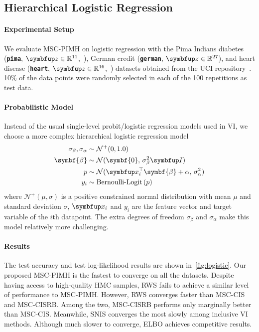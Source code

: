 \subsection{Hierarchical Logistic Regression}\label{section:logistic}
\vspace{-0.05in}
\paragraph{Experimental Setup}
We evaluate MSC-PIMH on logistic regression with the Pima Indians diabetes (\textbf{\texttt{pima}}, \(\vz \in \mathbb{R}^{11}\),~\citealt{smith_using_1988}), German credit (\textbf{\texttt{german}}, \(\vz \in \mathbb{R}^{27}\)), and heart disease (\textbf{\texttt{heart}}, \(\vz \in \mathbb{R}^{16}\),~\citealt{detrano_international_1989}) datasets obtained from the UCI repository~\citep{Dua:2019}.
10\% of the data points were randomly selected in each of the 100 repetitions as test data.

\vspace{-0.1in}
\paragraph{Probabilistic Model}
Instead of the usual single-level probit/logistic regression models used in VI, we choose a more complex hierarchical logistic regression model 
%
\begin{align*}
\sigma_{\beta}, \sigma_{\alpha} &\sim \mathcal{N}^{+}(0, 1.0) \\
\symbf{\beta} &\sim \mathcal{N}(\symbf{0},\, \sigma_{\beta}^2 \mI) \\
p &\sim \mathcal{N}(\vx_i^{\top}\symbf{\beta} + \alpha,\, \sigma_{\alpha}^2) \\
y_i &\sim \text{Bernoulli-Logit}\,(p)
\end{align*}
%
where \(\mathcal{N}^+(\mu, \sigma)\) is a positive constrained normal distribution with mean \(\mu\) and standard deviation \(\sigma\), \(\vx_i\) and \(y_i\) are the feature vector and target variable of the \(i\)th datapoint.
The extra degrees of freedom \(\sigma_{\beta}\) and \(\sigma_{\alpha}\) make this model relatively more challenging.

\vspace{-0.05in}
\paragraph{Results}
The test accuracy and test log-likelihood results are shown in~\cref{fig:logistic}.
Our proposed MSC-PIMH is the fastest to converge on all the datasets.
Despite having access to high-quality HMC samples, RWS fails to achieve a similar level of performance to MSC-PIMH.
However, RWS converges faster than MSC-CIS and MSC-CISRB.
Among the two, MSC-CISRB performs only marginally better than MSC-CIS.
Meanwhile, SNIS converges the most slowly among inclusive VI methods.
Although much slower to converge, ELBO achieves competitive results.

